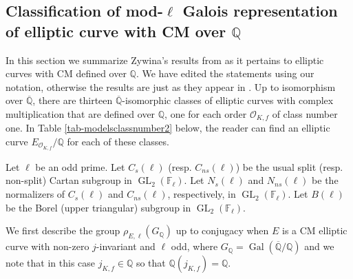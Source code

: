 \documentclass[11pt]{amsart}
\theoremstyle{definition}
\newcommand{\Q}{\mathbb Q}
\newcommand{\QQ}{\mathbb Q}
\newcommand{\FF}{\mathbb F}
\newcommand{\Qbar}{\overline{\mathbb{Q}}}
\newcommand{\Of}{\mathcal{O}_{K,f}}
\newcommand{\Gal}{\operatorname{Gal}}
\newcommand{\GL}{\operatorname{GL}}
\begin{document}
\subsection{Classification of mod-$\ell$ Galois representation of elliptic curve with CM over $\QQ$}

In this section we summarize Zywina's results from \cite{zywina} as it pertains to elliptic curves with CM defined over $\Q$. We have edited the statements using our notation, otherwise the results are just as they appear in \cite{zywina}. Up to isomorphism over $\Qbar$, there are thirteen $\Qbar$-isomorphic classes of elliptic curves with complex multiplication that are defined over $\QQ$, one for each order $\Of$ of class number one.  In Table \ref{tab-modelsclassnumber2} below, the reader can find an elliptic curve $E_{\Of}/\QQ$ for each of these classes. 

Let  $\ell$ be an odd prime. Let  $C_s(\ell)$ (resp. $C_{ns}(\ell)$) be the usual split (resp. non-split) Cartan subgroup in $\GL_2(\FF_\ell)$. Let $N_s(\ell)$ and $N_{ns}(\ell)$ be the normalizers of $C_{s}(\ell)$ and $C_{ns}(\ell)$, respectively, in $\GL_2(\FF_\ell)$.   Let $B(\ell)$ be the Borel (upper triangular) subgroup in $\GL_2(\FF_\ell)$.

We first describe the group $\rho_{E,\ell}(G_\Q)$ up to conjugacy when $E$ is a CM elliptic curve with non-zero $j$-invariant and $\ell$ odd, where $G_\Q=\Gal(\overline{\Q}/\Q)$ and we note that in this case $j_{K,f}\in \Q$ so that $\Q(j_{K,f})=\Q$.
\end{document}
